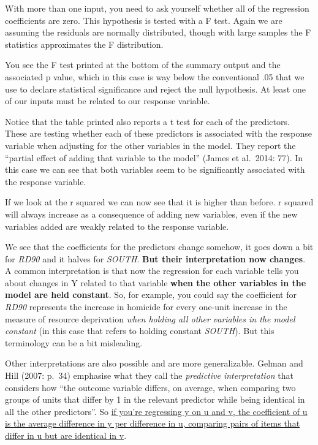 \documentclass[]{book}
\begin{document}
With more than one input, you need to ask yourself whether all of the regression coefficients are zero. This hypothesis is tested with a F test. Again we are assuming the residuals are normally distributed, though with large samples the F statistics approximates the F distribution.

You see the F test printed at the bottom of the summary output and the associated p value, which in this case is way below the conventional .05 that we use to declare statistical significance and reject the null hypothesis. At least one of our inputs must be related to our response variable.

Notice that the table printed also reports a t test for each of the predictors. These are testing whether each of these predictors is associated with the response variable when adjusting for the other variables in the model. They report the ``partial effect of adding that variable to the model'' (James et al.~2014: 77). In this case we can see that both variables seem to be significantly associated with the response variable.

If we look at the r squared we can now see that it is higher than before. r squared will always increase as a consequence of adding new variables, even if the new variables added are weakly related to the response variable.

We see that the coefficients for the predictors change somehow, it goes down a bit for \emph{RD90} and it halves for \emph{SOUTH}. \textbf{But their interpretation now changes}. A common interpretation is that now the regression for each variable tells you about changes in Y related to that variable \textbf{when the other variables in the model are held constant}. So, for example, you could say the coefficient for \emph{RD90} represents the increase in homicide for every one-unit increase in the measure of resource deprivation \emph{when holding all other variables in the model constant} (in this case that refers to holding constant \emph{SOUTH}). But this terminology can be a bit misleading.

Other interpretations are also possible and are more generalizable. Gelman and Hill (2007: p.~34) emphasise what they call the \emph{predictive interpretation} that considers how ``the outcome variable differs, on average, when comparing two groups of units that differ by 1 in the relevant predictor while being identical in all the other predictors''. So \href{http://andrewgelman.com/2013/01/05/understanding-regression-models-and-regression-coefficients/}{if you're regressing y on u and v, the coefficient of u is the average difference in y per difference in u, comparing pairs of items that differ in u but are identical in v}.
\end{document}
